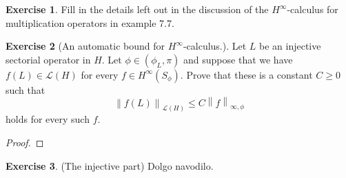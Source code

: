 \documentclass[a4paper,11pt]{article}
\newcommand{\norm}[1]{\left\lVert#1\right\rVert} %
\theoremstyle{definition}
\newtheorem{exercise}{Exercise}
\begin{document}
\begin{exercise}
    Fill in the details left out in the discussion of the $H^\infty$-calculus for multiplication operators in example 7.7. 
\end{exercise}

\begin{exercise}[An automatic bound for $H^{\infty}$-calculus.]
    Let $L$ be an injective sectorial operator in $H$. Let $\phi \in (\phi_L,\pi)$ and suppose that we have $f(L) \in \mathcal{L}(H)$ for every $f \in H^\infty(S_\phi)$.
    Prove that these is a constant $C \ge 0$ such that 
    \[\norm{f(L)}_{\mathcal{L}(H)} \le C \norm{f}_{\infty, \phi}\]
    holds for every such $f$.
\end{exercise}

\begin{proof}
    
\end{proof}

\begin{exercise}(The injective part)
    Dolgo navodilo.
\end{exercise}
\end{document}
